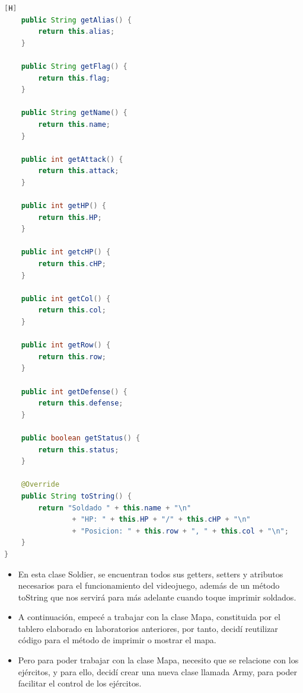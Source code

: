 \documentclass{article}
\begin{document}
\begin{lstlisting}[language=java,caption={Superclase Soldado}][H]
    public String getAlias() {
        return this.alias;
    }

    public String getFlag() {
        return this.flag;
    }

    public String getName() {
        return this.name;
    }

    public int getAttack() {
        return this.attack;
    }

    public int getHP() {
        return this.HP;
    }

    public int getcHP() {
        return this.cHP;
    }

    public int getCol() {
        return this.col;
    }

    public int getRow() {
        return this.row;
    }

    public int getDefense() {
        return this.defense;
    }

    public boolean getStatus() {
        return this.status;
    }

    @Override
    public String toString() {
        return "Soldado " + this.name + "\n"
                + "HP: " + this.HP + "/" + this.cHP + "\n"
                + "Posicion: " + this.row + ", " + this.col + "\n";
    }
}
	\end{lstlisting}
	\begin{itemize}	
		\item En esta clase Soldier, se encuentran todos sus getters, setters y atributos necesarios para el funcionamiento del videojuego, además de un método toString que nos servirá para más adelante cuando toque imprimir soldados.
		\item A continuación, empecé a trabajar con la clase Mapa, constituida por el tablero elaborado en laboratorios anteriores, por tanto, decidí reutilizar código para el método de imprimir o mostrar el mapa.
		\item Pero para poder trabajar con la clase Mapa, necesito que se relacione con los ejércitos, y para ello, decidí crear una nueva clase llamada Army, para poder facilitar el control de los ejércitos.
	\end{itemize}
	
\end{document}
